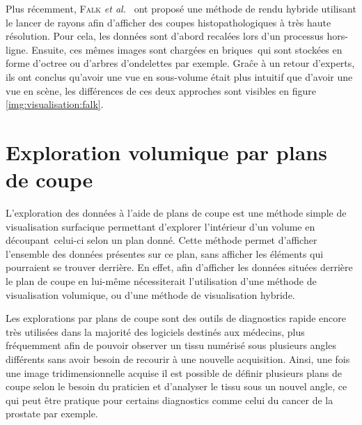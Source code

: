 {{{            Plus récemment, \textsc{Falk} \textit{et al.}~\cite{cite_3d_real_time_histopathology} ont proposé une méthode de rendu hybride utilisant le lancer de rayons afin d'afficher des coupes histopathologiques à très haute résolution. Pour cela, les données sont d'abord recalées lors d'un processus hors-ligne. Ensuite, ces mêmes images sont chargées en \og{}briques~\fg qui sont stockées en forme d'octree ou d'arbres d'ondelettes par exemple. Graĉe à un retour d'experts, ils ont conclus qu'avoir une vue en sous-volume était plus intuitif que d'avoir une vue en scène, les différences de ces deux approches sont visibles en figure \ref{img:visualisation:falk}.
        }
    }

	\section{Exploration volumique par plans de coupe}\label{section:visualisation:cuttingplanes}
	{

		L'exploration des données à l'aide de plans de coupe est une méthode simple de visualisation surfacique permettant d'explorer l'intérieur d'un volume en \og{}découpant~\fg celui-ci selon un plan donné. Cette méthode permet d'afficher l'ensemble des données présentes sur ce plan, sans afficher les éléments qui pourraient se trouver derrière. En effet, afin d'afficher les données situées derrière le plan de coupe en lui-même nécessiterait l'utilisation d'une méthode de visualisation volumique, ou d'une méthode de visualisation hybride.

		Les explorations par plans de coupe sont des outils de diagnostics rapide encore très utilisées dans la majorité des logiciels destinés aux médecins, plus fréquemment afin de pouvoir observer un tissu numérisé sous plusieurs angles différents sans avoir besoin de recourir à une nouvelle acquisition. Ainsi, une fois une image tridimensionnelle acquise il est possible de définir plusieurs plans de coupe selon le besoin du praticien et d'analyser le tissu sous un nouvel angle, ce qui peut être pratique pour certains diagnostics comme celui du cancer de la prostate par exemple.

}}
